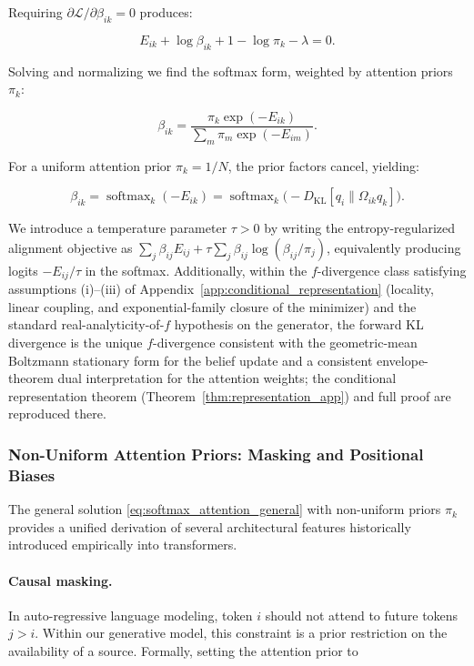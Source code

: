 \documentclass[11pt]{article}
\begin{document}
Requiring $\partial \mathcal{L} / \partial \beta_{ik} = 0$ produces:

\begin{equation}
E_{ik} + \log \beta_{ik} + 1 - \log \pi_k - \lambda = 0.
\end{equation}

Solving and normalizing we find the softmax form, weighted by attention priors $\pi_k$:

\begin{equation}
\beta_{ik} = \frac{\pi_k \exp(-E_{ik})}{\sum_m \pi_m \exp(-E_{im})}.
\label{eq:softmax_attention_general}
\end{equation}

For a uniform attention prior $\pi_k = 1/N$, the prior factors cancel, yielding:

\begin{equation}
\boxed{\beta_{ik} = \operatorname{softmax}_k(-E_{ik}) = \operatorname{softmax}_k\big(-D_{\mathrm{KL}}[q_i \| \Omega_{ik} q_k]\big).}
\label{eq:mixture_softmax}
\end{equation}

We introduce a temperature parameter $\tau>0$ by writing the entropy-regularized alignment objective as $\sum_j\beta_{ij}E_{ij}+\tau\sum_j\beta_{ij}\log(\beta_{ij}/\pi_j)$, equivalently producing logits $-E_{ij}/\tau$ in the softmax. Additionally, within the $f$-divergence class satisfying assumptions (i)--(iii) of Appendix~\ref{app:conditional_representation} (locality, linear coupling, and exponential-family closure of the minimizer) and the standard real-analyticity-of-$f$ hypothesis on the generator, the forward KL divergence is the unique $f$-divergence consistent with the geometric-mean Boltzmann stationary form for the belief update and a consistent envelope-theorem dual interpretation for the attention weights; the conditional representation theorem (Theorem~\ref{thm:representation_app}) and full proof are reproduced there.

\subsubsection{Non-Uniform Attention Priors: Masking and Positional Biases}
\label{sec:nonuniform_priors}

The general solution \eqref{eq:softmax_attention_general} with non-uniform priors $\pi_k$ provides a unified derivation of several architectural features historically introduced empirically into transformers.

\paragraph{Causal masking.}
In auto-regressive language modeling, token $i$ should not attend to future tokens $j > i$. Within our generative model, this constraint is a prior restriction on the availability of a source. Formally, setting the attention prior to
\end{document}
